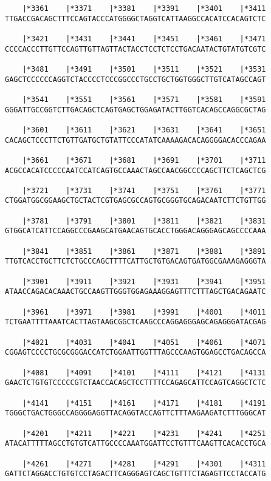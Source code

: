 \documentclass{article}
\begin{document}
\begin{Verbatim}
    |*3361    |*3371    |*3381    |*3391    |*3401    |*3411
TTGACCGACAGCTTTCCAGTACCCATGGGGCTAGGTCATTAAGGCCACATCCACAGTCTC
  
    |*3421    |*3431    |*3441    |*3451    |*3461    |*3471
CCCCACCCTTGTTCCAGTTGTTAGTTACTACCTCCTCTCCTGACAATACTGTATGTCGTC
  
    |*3481    |*3491    |*3501    |*3511    |*3521    |*3531
GAGCTCCCCCCAGGTCTACCCCTCCCGGCCCTGCCTGCTGGTGGGCTTGTCATAGCCAGT
  
    |*3541    |*3551    |*3561    |*3571    |*3581    |*3591
GGGATTGCCGGTCTTGACAGCTCAGTGAGCTGGAGATACTTGGTCACAGCCAGGCGCTAG
  
    |*3601    |*3611    |*3621    |*3631    |*3641    |*3651
CACAGCTCCCTTCTGTTGATGCTGTATTCCCATATCAAAAGACACAGGGGACACCCAGAA
  
    |*3661    |*3671    |*3681    |*3691    |*3701    |*3711
ACGCCACATCCCCCAATCCATCAGTGCCAAACTAGCCAACGGCCCCAGCTTCTCAGCTCG
  
    |*3721    |*3731    |*3741    |*3751    |*3761    |*3771
CTGGATGGCGGAAGCTGCTACTCGTGAGCGCCAGTGCGGGTGCAGACAATCTTCTGTTGG
  
    |*3781    |*3791    |*3801    |*3811    |*3821    |*3831
GTGGCATCATTCCAGGCCCGAAGCATGAACAGTGCACCTGGGACAGGGAGCAGCCCCAAA
  
    |*3841    |*3851    |*3861    |*3871    |*3881    |*3891
TTGTCACCTGCTTCTCTGCCCAGCTTTTCATTGCTGTGACAGTGATGGCGAAAGAGGGTA
  
    |*3901    |*3911    |*3921    |*3931    |*3941    |*3951
ATAACCAGACACAAACTGCCAAGTTGGGTGGAGAAAGGAGTTTCTTTAGCTGACAGAATC
  
    |*3961    |*3971    |*3981    |*3991    |*4001    |*4011
TCTGAATTTTAAATCACTTAGTAAGCGGCTCAAGCCCAGGAGGGAGCAGAGGGATACGAG
  
    |*4021    |*4031    |*4041    |*4051    |*4061    |*4071
CGGAGTCCCCTGCGCGGGACCATCTGGAATTGGTTTAGCCCAAGTGGAGCCTGACAGCCA
  
    |*4081    |*4091    |*4101    |*4111    |*4121    |*4131
GAACTCTGTGTCCCCCGTCTAACCACAGCTCCTTTTCCAGAGCATTCCAGTCAGGCTCTC
  
    |*4141    |*4151    |*4161    |*4171    |*4181    |*4191
TGGGCTGACTGGGCCAGGGGAGGTTACAGGTACCAGTTCTTTAAGAAGATCTTTGGGCAT
  
    |*4201    |*4211    |*4221    |*4231    |*4241    |*4251
ATACATTTTTAGCCTGTGTCATTGCCCCAAATGGATTCCTGTTTCAAGTTCACACCTGCA
  
    |*4261    |*4271    |*4281    |*4291    |*4301    |*4311
GATTCTAGGACCTGTGTCCTAGACTTCAGGGAGTCAGCTGTTTCTAGAGTTCCTACCATG
  

\end{Verbatim}
\end{document}
